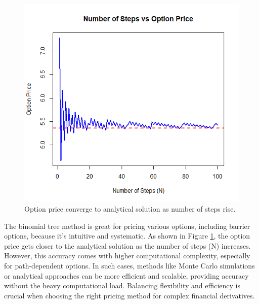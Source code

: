 \begin{figure}[h]
    \centering
    \includegraphics[width=.65\linewidth]{content/images/numstepsvsoptionprice.png}
    \caption{Option price converge to analytical solution as number of steps rise.}
    \label{fig:binom-nofsteps}
\end{figure}

The binomial tree method is great for pricing various options, including barrier options, because it's intuitive and systematic. As shown in Figure \ref{fig:binom-nofsteps}, the option price gets closer to the analytical solution as the number of steps (N) increases. However, this accuracy comes with higher computational complexity, especially for path-dependent options. In such cases, methods like Monte Carlo simulations or analytical approaches can be more efficient and scalable, providing accuracy without the heavy computational load. Balancing flexibility and efficiency is crucial when choosing the right pricing method for complex financial derivatives.